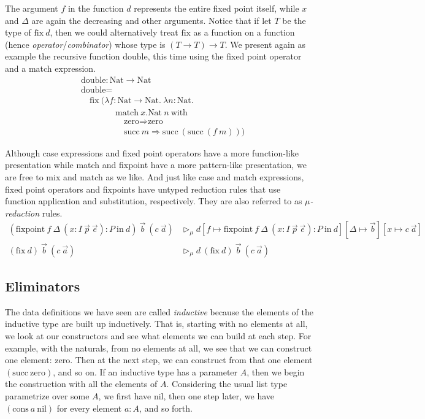 \documentclass{report}
\newcommand{\Nat}{\const{Nat}}
\newcommand{\zero}{\const{zero}}
\renewcommand{\succ}{\const{succ}}
\newcommand{\nil}{\const{nil}}
\newcommand{\cons}{\const{cons}}
\newcommand{\const}[1]{\text{#1}}
\newcommand{\match}{\const{match}}
\newcommand{\with}{\const{with}}
\newcommand{\inn}{\const{in}}
\newcommand{\fixpoint}{\const{fixpoint}}
\newcommand{\fix}{\const{fix}}
\begin{document}
The argument $f$ in the function $d$ represents the entire fixed point itself, while $x$ and $\Delta$ are again the decreasing and other arguments. Notice that if let $T$ be the type of $\fix ~ d$, then we could alternatively treat $\fix$ as a function on a function (hence \emph{operator}/\emph{combinator}) whose type is $(T \to T) \to T$. We present again as example the recursive function $\const{double}$, this time using the fixed point operator and a match expression.
%
\begin{align*}
    &\const{double} : \Nat \to \Nat \\
    &\const{double} = \\
    &\quad \fix ~ (\lambda f : \Nat \to \Nat. ~ \lambda n: \Nat. \\
    &\qquad\qquad \match ~ x.\Nat ~ n ~ \with \\
    &\quad\qquad\qquad \zero \Rightarrow \zero \\
    &\quad\qquad\qquad \succ ~ m \Rightarrow \succ ~ (\succ ~ (f ~ m)))
\end{align*}

Although case expressions and fixed point operators have a more function-like presentation while match and fixpoint have a more pattern-like presentation, we are free to mix and match as we like. And just like case and match expressions, fixed point operators and fixpoints have untyped reduction rules that use function application and substitution, respectively. They are also referred to as \emph{$\mu$-reduction} rules.
%
\begin{align*}
    (\fixpoint ~ f ~ \Delta ~ (x : I ~ \Vec{p} ~ \Vec{e}) : P ~ \inn ~ d) ~ \Vec{b} ~ (c ~ \Vec{a}) &\rhd_{\mu} d[f \mapsto \fixpoint ~ f ~ \Delta ~ (x : I ~ \Vec{p} ~ \Vec{e}) : P ~ \inn ~ d][\Delta \mapsto \Vec{b}][x \mapsto c ~ \Vec{a}] \\
    (\fix ~ d) ~ \Vec{b} ~ (c ~ \Vec{a}) &\rhd_{\mu} d ~ (\fix ~ d) ~ \Vec{b} ~ (c ~ \Vec{a})
\end{align*}

\subsection{Eliminators}

The data definitions we have seen are called \emph{inductive} because the elements of the inductive type are built up inductively. That is, starting with no elements at all, we look at our constructors and see what elements we can build at each step. For example, with the naturals, from no elements at all, we see that we can construct one element: $\zero$. Then at the next step, we can construct from that one element $(\succ ~ \zero)$, and so on. If an inductive type has a parameter $A$, then we begin the construction with all the elements of $A$. Considering the usual list type parametrize over some $A$, we first have $\nil$, then one step later, we have $(\cons ~ a ~ \nil)$ for every element $a : A$, and so forth.
\end{document}
